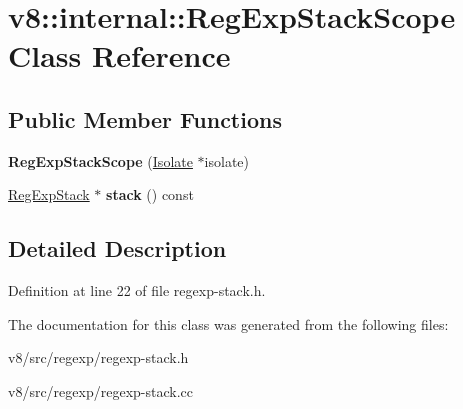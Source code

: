 \hypertarget{classv8_1_1internal_1_1RegExpStackScope}{}\section{v8\+:\+:internal\+:\+:Reg\+Exp\+Stack\+Scope Class Reference}
\label{classv8_1_1internal_1_1RegExpStackScope}
\subsection*{Public Member Functions}
\begin{DoxyCompactItemize}
\item 
\mbox{\label{classv8_1_1internal_1_1RegExpStackScope_a7c5e8546faa6a48c189159dd7573d068}} 
{\bfseries Reg\+Exp\+Stack\+Scope} (\mbox{\hyperlink{classv8_1_1internal_1_1Isolate}{Isolate}} $\ast$isolate)
\item 
\mbox{\label{classv8_1_1internal_1_1RegExpStackScope_aa8fa9eb831b1c1ca55d65b23e8f6349e}} 
\mbox{\hyperlink{classv8_1_1internal_1_1RegExpStack}{Reg\+Exp\+Stack}} $\ast$ {\bfseries stack} () const
\end{DoxyCompactItemize}


\subsection{Detailed Description}


Definition at line 22 of file regexp-\/stack.\+h.



The documentation for this class was generated from the following files\+:\begin{DoxyCompactItemize}
\item 
v8/src/regexp/regexp-\/stack.\+h\item 
v8/src/regexp/regexp-\/stack.\+cc\end{DoxyCompactItemize}
